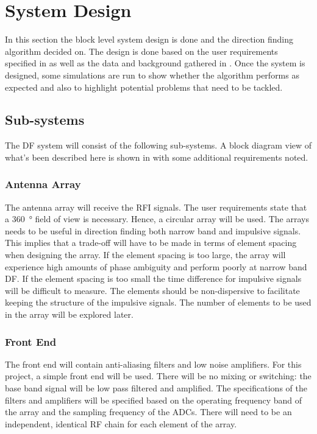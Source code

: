 \chapter{System Design}
\label{ch:system-design}
\graphicspath{{./img/system-design/}}

In this section the block level system design is done and the direction finding algorithm decided on.
The design is done based on the user requirements specified in  as well as the data and background gathered in .
Once the system is designed, some simulations are run to show whether the algorithm performs as expected and also to highlight potential problems that need to be tackled.

\section{Sub-systems}
The DF system will consist of the following sub-systems.
A block diagram view of what's been described here is shown in  with some additional requirements noted.

\subsection{Antenna Array}
The antenna array will receive the RFI signals. The user requirements state that a \SI{360}{\degree} field of view is necessary. Hence, a circular array will be used. The arrays needs to be useful in direction finding both narrow band and impulsive signals. This implies that a trade-off will have to be made in terms of element spacing when designing the array. If the element spacing is too large, the array will experience high amounts of phase ambiguity and perform poorly at narrow band DF. If the element spacing is too small the time difference for impulsive signals will be difficult to measure. The elements should be non-dispersive to facilitate keeping the structure of the impulsive signals. The number of elements to be used in the array will be explored later.

\subsection{Front End}
The front end will contain anti-aliasing filters and low noise amplifiers. For this project, a simple front end will be used. There will be no mixing or switching: the base band signal will be low pass filtered and amplified. The specifications of the filters and amplifiers will be specified based on the operating frequency band of the array and the sampling frequency of the ADCs. There will need to be an independent, identical RF chain for each element of the array.

